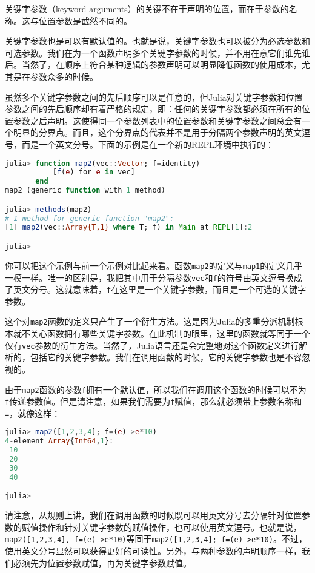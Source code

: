 关键字参数（keyword arguments）的关键不在于声明的位置，而在于参数的名称。这与位置参数是截然不同的。

关键字参数也是可以有默认值的。也就是说，关键字参数也可以被分为必选参数和可选参数。我们在为一个函数声明多个关键字参数的时候，并不用在意它们谁先谁后。当然了，在顺序上符合某种逻辑的参数声明可以明显降低函数的使用成本，尤其是在参数众多的时候。

虽然多个关键字参数之间的先后顺序可以是任意的，但Julia对关键字参数和位置参数之间的先后顺序却有着严格的规定，即：任何的关键字参数都必须在所有的位置参数之后声明。这使得同一个参数列表中的位置参数和关键字参数之间总会有一个明显的分界点。而且，这个分界点的代表并不是用于分隔两个参数声明的英文逗号，而是一个英文分号。下面的示例是在一个新的REPL环境中执行的：

\begin{lstlisting}[language=julia]
julia> function map2(vec::Vector; f=identity)
           [f(e) for e in vec]
       end
map2 (generic function with 1 method)

julia> methods(map2)
# 1 method for generic function "map2":
[1] map2(vec::Array{T,1} where T; f) in Main at REPL[1]:2

julia> 
\end{lstlisting}

你可以把这个示例与前一个示例对比起来看。函数\verb`map2`的定义与\verb`map1`的定义几乎一模一样。唯一的区别是，我把其中用于分隔参数\verb`vec`和\verb`f`的符号由英文逗号换成了英文分号。这就意味着，\verb`f`在这里是一个关键字参数，而且是一个可选的关键字参数。

这个对\verb`map2`函数的定义只产生了一个衍生方法。这是因为Julia的多重分派机制根本就不关心函数拥有哪些关键字参数。在此机制的眼里，这里的函数就等同于一个仅有\verb`vec`参数的衍生方法。当然了，Julia语言还是会完整地对这个函数定义进行解析的，包括它的关键字参数。我们在调用函数的时候，它的关键字参数也是不容忽视的。

由于\verb`map2`函数的参数\verb`f`拥有一个默认值，所以我们在调用这个函数的时候可以不为\verb`f`传递参数值。但是请注意，如果我们需要为\verb`f`赋值，那么就必须带上参数名称和\verb`=`，就像这样：

\begin{lstlisting}[language=julia]
julia> map2([1,2,3,4]; f=(e)->e*10)
4-element Array{Int64,1}:
 10
 20
 30
 40

julia>
\end{lstlisting}

请注意，从规则上讲，我们在调用函数的时候既可以用英文分号去分隔针对位置参数的赋值操作和针对关键字参数的赋值操作，也可以使用英文逗号。也就是说，\verb`map2([1,2,3,4], f=(e)->e*10)`等同于\verb`map2([1,2,3,4]; f=(e)->e*10)`。不过，使用英文分号显然可以获得更好的可读性。另外，与两种参数的声明顺序一样，我们必须先为位置参数赋值，再为关键字参数赋值。

